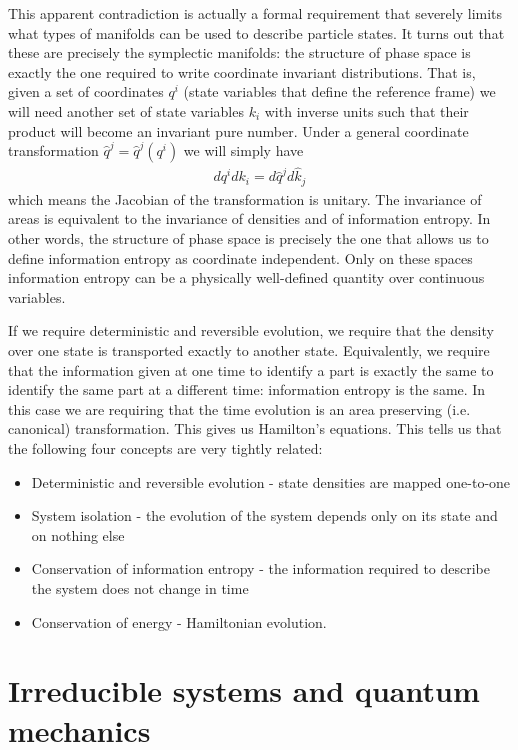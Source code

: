 \documentclass{ws-ijqi}
\begin{document}
This apparent contradiction is actually a formal requirement that severely limits what types of manifolds can be used to describe particle states. It turns out that these are precisely the symplectic manifolds: the structure of phase space is exactly the one required to write coordinate invariant distributions. That is, given a set of coordinates $q^i$ (state variables that define the reference frame) we will need another set of state variables $k_i$ with inverse units such that their product will become an invariant pure number. Under a general coordinate transformation $\hat{q}^j = \hat{q}^j (q^i)$ we will simply have 
\begin{equation}
\begin{aligned}
dq^i dk_i = d\hat{q}^j d\hat{k}_j
\end{aligned}
\end{equation}
which means the Jacobian of the transformation is unitary. The invariance of areas is equivalent to the invariance of densities and of information entropy. In other words, the structure of phase space is precisely the one that allows us to define information entropy as coordinate independent. Only on these spaces information entropy can be a physically well-defined quantity over continuous variables.

If we require deterministic and reversible evolution, we require that the density over one state is transported exactly to another state. Equivalently, we require that the information given at one time to identify a part is exactly the same to identify the same part at a different time: information entropy is the same. In this case we are requiring that the time evolution is an area preserving (i.e. canonical) transformation. This gives us Hamilton's equations. This tells us that the following four concepts are very tightly related:
\begin{itemize}
	\item Deterministic and reversible evolution - state densities are mapped one-to-one
	\item System isolation - the evolution of the system depends only on its state and on nothing else
	\item Conservation of information entropy - the information required to describe the system does not change in time
	\item Conservation of energy - Hamiltonian evolution.
\end{itemize}

\section{Irreducible systems and quantum mechanics}
\end{document}
